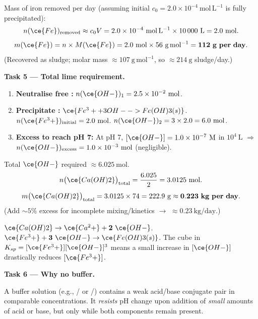 \documentclass[11pt]{article}
\begin{document}
Mass of iron removed per day (assuming initial $c_0 = 2.0\times10^{-4}\ \mathrm{mol\,L^{-1}}$ is fully precipitated):
\[
n(\ce{Fe})_{\text{removed}} \approx c_0 V = 2.0\times10^{-4}\ \mathrm{mol\,L^{-1}} \times 10\,000\ \mathrm{L} = 2.0\ \mathrm{mol}.
\]
\[
m(\ce{Fe}) = n \times M(\ce{Fe}) = 2.0\ \mathrm{mol} \times 56\ \mathrm{g\,mol^{-1}} = \mathbf{112\ g\ per\ day}.
\]
(Recovered as  sludge; molar mass  $\approx 107\ \mathrm{g\,mol^{-1}}$, so $\approx 214\ \mathrm{g}$ sludge/day.)

\textbf{Task 5 — Total lime requirement.}

\begin{enumerate}
\item \textbf{Neutralise free :} $n(\ce{OH-})_1 = 2.5\times10^{-2}\ \mathrm{mol}$.
\item \textbf{Precipitate :} $\ce{Fe^3+ + 3OH- -> Fe(OH)3(s)}$.
$n(\ce{Fe^3+})_{\text{initial}} = 2.0\ \mathrm{mol}$.
$n(\ce{OH-})_2 = 3 \times 2.0 = 6.0\ \mathrm{mol}$.
\item \textbf{Excess to reach pH 7:} At pH 7, $[\ce{OH-}] = 1.0\times10^{-7}\ \mathrm{M}$ in $10^4\ \mathrm{L}$ $\Rightarrow$ $n(\ce{OH-})_{\text{excess}} = 1.0\times10^{-3}\ \mathrm{mol}$ (negligible).
\end{enumerate}
Total $\ce{OH-}$ required $\approx 6.025\ \mathrm{mol}$.
\[
n\big(\ce{Ca(OH)2}\big)_{\text{total}} = \frac{6.025}{2} = 3.0125\ \mathrm{mol}.
\]
\[
m\big(\ce{Ca(OH)2}\big)_{\text{total}} = 3.0125 \times 74 = 222.9\ \mathrm{g} \approx \mathbf{0.223\ kg\ per\ day}.
\]
(Add $\sim 5\%$ excess for incomplete mixing/kinetics $\rightarrow$ \textbf{$\approx 0.23\ \mathrm{kg/day}$}.)

\begin{attention}
$\ce{Ca(OH)2} \rightarrow \ce{Ca^2+} + \mathbf{2}\ \ce{OH-}$.
$\ce{Fe^3+} + \mathbf{3}\ \ce{OH-} \rightarrow \ce{Fe(OH)3(s)}$.
The cube in $K_{sp} = [\ce{Fe^3+}][\ce{OH-}]^3$ means a small increase in $[\ce{OH-}]$ drastically reduces $[\ce{Fe^3+}]$.
\end{attention}

\textbf{Task 6 — Why no buffer.}

A buffer solution (e.g., / or /) contains a weak acid/base conjugate pair in comparable concentrations. It \emph{resists} pH change upon addition of \emph{small} amounts of acid or base, but only while both components remain present.
\end{document}
